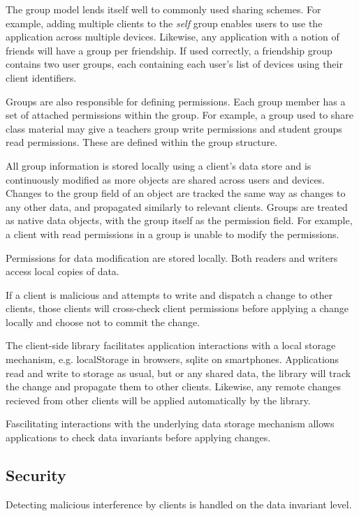 The group model lends itself well to commonly used sharing schemes. For example, adding multiple clients to the \textit{self} group enables users to use the application across multiple devices. Likewise, any application with a notion of friends will have a group per friendship. If used correctly, a friendship group contains two user groups, each containing each user's list of devices using their client identifiers.

Groups are also responsible for defining permissions. Each group member has a set of attached permissions within the group. For example, a group used to share class material may give a teachers group write permissions and student groups read permissions. These are defined within the group structure.

All group information is stored locally using a client's data store and is continuously modified as more objects are shared across users and devices.
Changes to the group field of an object are tracked the same way as changes to any other data, and propagated similarly to relevant clients. Groups are treated as \name{} native data objects, with the group itself as the permission field. For example, a client with read permissions in a group is unable to modify the permissions. 

Permissions for data modification are stored locally. Both readers and writers access local copies of data. 

If a client is malicious and attempts to write and dispatch a change to other clients, those clients will cross-check client permissions before applying a change locally and choose not to commit the change.


The \name{} client-side library facilitates application interactions with a local storage mechanism, e.g. localStorage in browsers, sqlite on smartphones. Applications read and write to storage as usual, but or any shared data, the library will track the change and propagate them to other clients. Likewise, any remote changes recieved from other clients will be applied automatically by the library.

Fascilitating interactions with the underlying data storage mechanism allows \name{} applications to check data invariants before applying changes. 

\subsection{Security}
Detecting malicious interference by clients is handled on the data invariant level.

